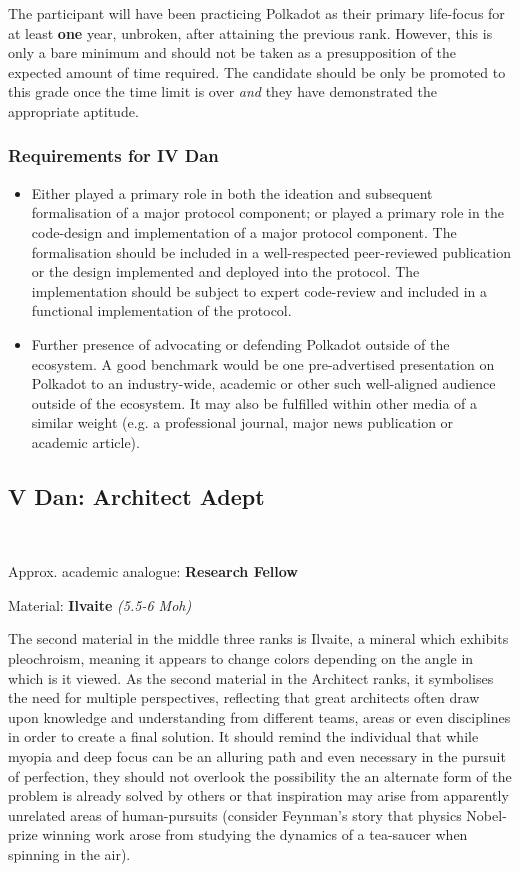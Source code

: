 \documentclass[9pt,oneside]{amsart}
\begin{document}
The participant will have been practicing Polkadot as their primary life-focus for at least \textbf{one} year, unbroken, after attaining the previous rank. However, this is only a bare minimum and should not be taken as a presupposition of the expected amount of time required. The candidate should be only be promoted to this grade once the time limit is over \emph{and} they have demonstrated the appropriate aptitude.

\subsubsection{Requirements for IV Dan}\label{requirements-4}

\begin{itemize}
\item Either played a primary role in both the ideation and subsequent formalisation of a major protocol component; or played a primary role in the code-design and implementation of a major protocol component. The formalisation should be included in a well-respected peer-reviewed publication or the design implemented and deployed into the protocol. The implementation should be subject to expert code-review and included in a functional implementation of the protocol.
\item Further presence of advocating or defending Polkadot outside of the ecosystem. A good benchmark would be one pre-advertised presentation on Polkadot to an industry-wide, academic or other such well-aligned audience outside of the ecosystem. It may also be fulfilled within other media of a similar weight (e.g. a professional journal, major news publication or academic article).
\end{itemize}

\subsection{V Dan: Architect Adept}\label{v-dan-architect-adept}~\\


Approx. academic analogue: \textbf{Research Fellow}

Material: \textbf{Ilvaite} \emph{(5.5-6 Moh)}

The second material in the middle three ranks is Ilvaite, a mineral which exhibits pleochroism, meaning it appears to change colors depending on the angle in which is it viewed. As the second material in the Architect ranks, it symbolises the need for multiple perspectives, reflecting that great architects often draw upon knowledge and understanding from different teams, areas or even disciplines in order to create a final solution. It should remind the individual that while myopia and deep focus can be an alluring path and even necessary in the pursuit of perfection, they should not overlook the possibility the an alternate form of the problem is already solved by others or that inspiration may arise from apparently unrelated areas of human-pursuits (consider Feynman's story that physics Nobel-prize winning work arose from studying the dynamics of a tea-saucer when spinning in the air).
\end{document}
